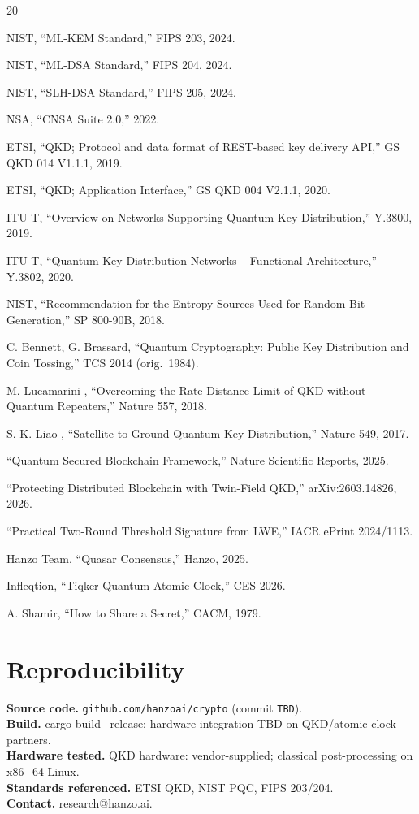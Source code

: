 \documentclass[11pt,letterpaper]{article}
\begin{document}
\begin{thebibliography}{20}

 NIST, ``ML-KEM Standard,'' FIPS 203, 2024.

 NIST, ``ML-DSA Standard,'' FIPS 204, 2024.

 NIST, ``SLH-DSA Standard,'' FIPS 205, 2024.

 NSA, ``CNSA Suite 2.0,'' 2022.

 ETSI, ``QKD; Protocol and data format of REST-based key delivery API,'' GS QKD 014 V1.1.1, 2019.

 ETSI, ``QKD; Application Interface,'' GS QKD 004 V2.1.1, 2020.

 ITU-T, ``Overview on Networks Supporting Quantum Key Distribution,'' Y.3800, 2019.

 ITU-T, ``Quantum Key Distribution Networks -- Functional Architecture,'' Y.3802, 2020.

 NIST, ``Recommendation for the Entropy Sources Used for Random Bit Generation,'' SP 800-90B, 2018.

 C. Bennett, G. Brassard, ``Quantum Cryptography: Public Key Distribution and Coin Tossing,'' TCS 2014 (orig.\ 1984).

 M. Lucamarini \etal, ``Overcoming the Rate-Distance Limit of QKD without Quantum Repeaters,'' Nature 557, 2018.

 S.-K. Liao \etal, ``Satellite-to-Ground Quantum Key Distribution,'' Nature 549, 2017.

 ``Quantum Secured Blockchain Framework,'' Nature Scientific Reports, 2025.

 ``Protecting Distributed Blockchain with Twin-Field QKD,'' arXiv:2603.14826, 2026.

 ``Practical Two-Round Threshold Signature from LWE,'' IACR ePrint 2024/1113.

 Hanzo Team, ``Quasar Consensus,'' Hanzo, 2025.

 Infleqtion, ``Tiqker Quantum Atomic Clock,'' CES 2026.

 A. Shamir, ``How to Share a Secret,'' CACM, 1979.

\end{thebibliography}

\section*{Reproducibility}
\textbf{Source code.} \texttt{github.com/hanzoai/crypto} (commit \texttt{TBD}).\\
\textbf{Build.} cargo build --release; hardware integration TBD on QKD/atomic-clock partners.\\
\textbf{Hardware tested.} QKD hardware: vendor-supplied; classical post-processing on x86\_64 Linux.\\
\textbf{Standards referenced.} ETSI QKD, NIST PQC, FIPS 203/204.\\
\textbf{Contact.} research@hanzo.ai.
\end{document}

